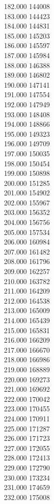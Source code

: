 { 182.000	144008 \\
 183.000	144423 \\
 184.000	144831 \\
 185.000	145203 \\
 186.000	145597 \\
 187.000	145984 \\
 188.000	146388 \\
 189.000	146802 \\
 190.000	147141 \\
 191.000	147554 \\
 192.000	147949 \\
 193.000	148408 \\
 194.000	148866 \\
 195.000	149323 \\
 196.000	149709 \\
 197.000	150035 \\
 198.000	150454 \\
 199.000	150898 \\
 200.000	151285 \\
 201.000	154902 \\
 202.000	155967 \\
 203.000	156352 \\
 204.000	156756 \\
 205.000	157534 \\
 206.000	160984 \\
 207.000	161482 \\
 208.000	161796 \\
 209.000	162257 \\
 210.000	163782 \\
 211.000	164209 \\
 212.000	164538 \\
 213.000	165009 \\
 214.000	165439 \\
 215.000	165831 \\
 216.000	166209 \\
 217.000	166670 \\
 218.000	166986 \\
 219.000	168889 \\
 220.000	169273 \\
 221.000	169692 \\
 222.000	170042 \\
 223.000	170455 \\
 224.000	170911 \\
 225.000	171287 \\
 226.000	171723 \\
 227.000	172055 \\
 228.000	172413 \\
 229.000	172790 \\
 230.000	173234 \\
 231.000	174659 \\
 232.000	175008 \\
}
